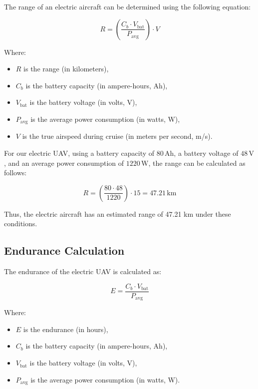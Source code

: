 \documentclass[12pt]{article}
\begin{document}
	The range of an electric aircraft can be determined using the following equation:
	
	\begin{equation}
		R = \left(\frac{C_b \cdot V_{\text{bat}}}{P_{\text{avg}}}\right) \cdot V
	\end{equation}
	
	Where:
	\begin{itemize}
		\item \(R\) is the range (in kilometers),
		\item \(C_b\) is the battery capacity (in ampere-hours, Ah),
		\item \(V_{\text{bat}}\) is the battery voltage (in volts, V),
		\item \(P_{\text{avg}}\) is the average power consumption (in watts, W),
		\item \(V\) is the true airspeed during cruise (in meters per second, m/s).
	\end{itemize}
	
	For our electric UAV, using a battery capacity of \(80 \, \text{Ah}\), a battery voltage of \(48 \, \text{V}\), and an average power consumption of \(1220 \, \text{W}\), the range can be calculated as follows:
	
	\[
	R = \left(\frac{80 \cdot 48}{1220}\right) \cdot 15 = 47.21 \, \text{km}
	\]
	
	Thus, the electric aircraft has an estimated range of 47.21 km under these conditions.
	
	\subsection{Endurance Calculation}
	
	The endurance of the electric UAV is calculated as:
	
	\begin{equation}
		E = \frac{C_b \cdot V_{\text{bat}}}{P_{\text{avg}}}
	\end{equation}
	
	Where:
	\begin{itemize}
		\item \(E\) is the endurance (in hours),
		\item \(C_b\) is the battery capacity (in ampere-hours, Ah),
		\item \(V_{\text{bat}}\) is the battery voltage (in volts, V),
		\item \(P_{\text{avg}}\) is the average power consumption (in watts, W).
	\end{itemize}
	
\end{document}
